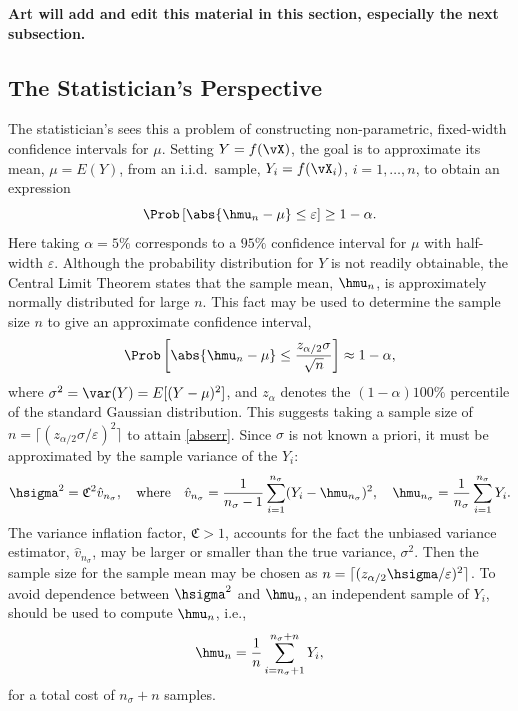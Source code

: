 \documentclass[graybox]{svmult}
\newcommand{\hv}{\hat{v}}
\newcommand{\fudge}{\mathfrak{C}}
\begin{document}
{\bf Art will add and edit this material in this section, especially the next subsection.}

\subsection{The Statistician's Perspective} \label{statperspsec}  
The statistician's sees this a problem of constructing non-parametric, fixed-width confidence intervals for $\mu$.  Setting $Y=f(\vX)$, the goal is to approximate its mean, $\mu=E(Y)$, from an i.i.d.\ sample, $Y_i=f(\vX_i)$, $i=1, \ldots, n$, to obtain an expression
\begin{equation} \label{abserr}
\Prob\left[\abs{\hmu_n-\mu} \le \varepsilon \right] \geq 1-\alpha.
\end{equation}
Here taking $\alpha=5\%$ corresponds to a $95\%$ confidence interval for $\mu$ with half-width $\varepsilon$.  Although the probability distribution for $Y$ is not readily obtainable, the Central Limit Theorem states that the sample mean, $\hmu_n$, is approximately normally distributed for large $n$.  This fact may be used to determine the sample size $n$ to give an approximate confidence interval, 
\begin{equation} \label{CLT}
\Prob\left[\abs{\hmu_n-\mu} \le \frac{z_{\alpha/2} \sigma} {\sqrt{n}} \right] \approx 1-\alpha,
\end{equation}
where $\sigma^2 = \var(Y)=E[(Y-\mu)^2]$, and $z_\alpha$ denotes the $(1-\alpha)100\%$ percentile of the standard Gaussian distribution.  This suggests taking a sample size of $n=\lceil (z_{\alpha/2}\sigma/\varepsilon)^2\rceil$ to attain \eqref{abserr}.  Since $\sigma$ is not known a priori, it must be approximated by the sample variance of the $Y_i$:
\begin{equation} \label{samplevar}
\hsigma^2 = \fudge^2 \hv_{n_{\sigma}}, \quad \text{where} \quad \hv_{n_{\sigma}} = \frac 1{n_{\sigma}-1} \sum_{i=1}^{n_{\sigma}} (Y_i- \hmu_{n_{\sigma}})^2, \quad \hmu_{n_{\sigma}} = \frac 1{n_{\sigma}} \sum_{i=1}^{n_{\sigma}} Y_i.
\end{equation}
The variance inflation factor, $\fudge>1$, accounts for the fact the unbiased variance estimator, $\hv_{n_{\sigma}}$, may be larger or smaller than the true variance, $\sigma^2$.  Then the sample size for the sample mean may be chosen as $n=\lceil (z_{\alpha/2}\hsigma/\varepsilon)^2\rceil$.  To avoid dependence between $\hsigma^2$ and $\hmu_n$, an independent sample of $Y_i$, should be used to compute $\hmu_n$, i.e., 
\begin{equation} \label{simpleMCest}
\hmu_n = \frac 1n \sum_{i=n_{\sigma}+1}^{n_{\sigma}+n} Y_i,
\end{equation}
for a total cost of $n_{\sigma}+n$ samples.
\end{document}
